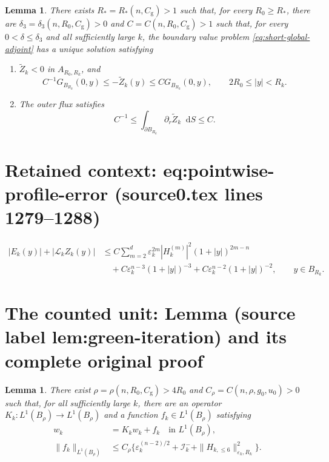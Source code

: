 \documentclass[10pt,a4paper]{amsart}
\newcommand{\dd}{\mathop{}\!\mathrm{d}}
\theoremstyle{plain}
\newtheorem{lemma}[theorem]{Lemma}
\theoremstyle{remark}
\begin{document}
 \begin{lemma} \label{lem:exterior-corrected-adjoint}
There exists $R_*=R_*(n,C_{\mathrm g})>1$ such that,
for every $R_0\ge R_*$, there are
$\delta_3=\delta_3(n,R_0,C_{\mathrm g})>0$ and
$C=C(n,R_0,C_{\mathrm g})>1$ such that, for every
$0<\delta\le\delta_3$ and all sufficiently large $k$, the boundary value
problem  \eqref{eq:short-global-adjoint} has a unique solution satisfying
\begin{enumerate}
\item[\emph{(i)}]
$\widetilde Z_k<0$ in $A_{R_0,R_k}$, and
{
\[
 C^{-1}G_{B_{R_k}}(0,y)\le-\widetilde Z_k(y)
 \le CG_{B_{R_k}}(0,y),\qquad 2R_0\le |y|<R_k.
\]
}
 \item[\emph{(ii)}]
The outer flux satisfies
{
\[
 C^{-1}\le\int_{\partial B_{R_k}}
 \partial_r\widetilde Z_k\dd S\le C.
\]
}
\end{enumerate}
\end{lemma}


\section*{Retained context: eq:pointwise-profile-error (source0.tex lines 1279--1288)}

\begin{equation}\label{eq:pointwise-profile-error}
\begin{aligned}
 |E_k(y)|+|\mathcal L_kZ_k(y)|
 &\le C\sum_{m=2}^d\varepsilon_k^{2m}|H_k^{(m)}|^2
       (1+|y|)^{2m-n}\\
 &\quad+C\varepsilon_k^{n-3}(1+|y|)^{-3}
  +C\varepsilon_k^{n-2}(1+|y|)^{-2},
 \qquad y\in B_{R_k}.
\end{aligned}
\end{equation}


\section{The counted unit: Lemma (source label lem:green-iteration) and its complete original proof}

 \begin{lemma} \label{lem:green-iteration}
There exist $\rho=\rho(n,R_0,C_{\mathrm g})>4R_0$ and
$C_\rho=C(n,\rho,g_0,u_0)>0$ such that, for all sufficiently large $k$,
there are an operator $K_k:L^1(B_\rho)\to L^1(B_\rho)$ and a function
$f_k\in L^1(B_\rho)$ satisfying
{
\[
\begin{aligned}
 w_k&=K_kw_k+f_k \quad \text{in }L^1(B_\rho),\\
 \|f_k\|_{L^1(B_\rho)}
 &\le C_\rho\big\{
 \varepsilon_k^{(n-2)/2}+\mathcal I_k^-
 +\|H_{k,\le6}\|_{\varepsilon_k,R_k}^2\big\}.
\end{aligned}
\]
}
 \end{lemma}
\end{document}
